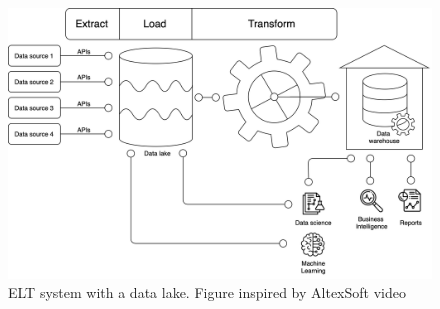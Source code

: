 \begin{figure}[!ht]
    \begin{center}
      \includegraphics[width=\textwidth]{figures/2-background/DeltaLake_evolution-ELT+DL.png}
    \end{center}
    \caption{\gls{ELT} system with a data lake. Figure inspired by AltexSoft video \cite{altexsoftHowDataEngineering2021}}
    \label{fig:ETL+DL}
\end{figure}